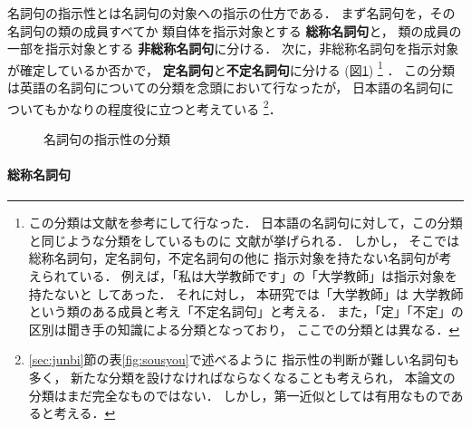 名詞句の指示性とは名詞句の対象への指示の仕方である．
まず名詞句を，その名詞句の類の成員すべてか
類自体を指示対象とする
{\bf 総称名詞句}と，
類の成員の一部を指示対象とする
{\bf 非総称名詞句}に分ける．
次に，非総称名詞句を指示対象が確定しているか否かで，
{\bf 定名詞句}と{\bf 不定名詞句}に分ける
(図\ref{fig:sijisei_bunrui})
\footnote{
この分類は文献\cite{Inoue1985}を参考にして行なった．
日本語の名詞句に対して，この分類と同じような分類をしているものに
文献\cite{Kinsui1986}が挙げられる．
しかし，
そこでは総称名詞句，定名詞句，不定名詞句の他に
指示対象を持たない名詞句が考えられている．
例えば，「私は大学教師です」の「大学教師」は指示対象を持たないと
してあった．
それに対し，
本研究では「大学教師」は
大学教師という類のある成員と考え「不定名詞句」と考える．
また，「定」「不定」の区別は聞き手の知識による分類となっており，
ここでの分類とは異なる．
}
．
この分類は英語の名詞句についての分類を念頭において行なったが，
日本語の名詞句についてもかなりの程度役に立つと考えている
\footnote{
\ref{sec:junbi}節の表\ref{fig:sousyou}で述べるように
    指示性の判断が難しい名詞句も多く，
    新たな分類を設けなければならなくなることも考えられ，
    本論文の分類はまだ完全なものではない．
    しかし，第一近似としては有用なものであると考える．
}．

\begin{figure}[t]
\small
\begin{center}
  \caption{名詞句の指示性の分類}
  \label{fig:sijisei_bunrui}
  \end{center}
\end{figure}


\paragraph{総称名詞句}

